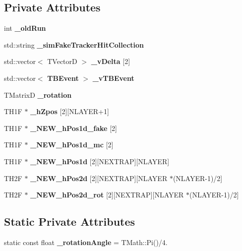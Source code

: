 \subsection*{Private Attributes}
\begin{DoxyCompactItemize}
\item 
int {\bfseries \_\-oldRun}\label{classTBTrackScatter_a2372dac837987cb91190c765e88afe5e}

\item 
std::string {\bfseries \_\-simFakeTrackerHitCollection}\label{classTBTrackScatter_aa6588dd0c39bb7233713e0316aa79bf1}

\item 
std::vector$<$ TVectorD $>$ {\bfseries \_\-vDelta} [2]\label{classTBTrackScatter_a4cc08b20f1c47a776a17b0fbdf3b5cde}

\item 
std::vector$<$ {\bf TBEvent} $>$ {\bfseries \_\-vTBEvent}\label{classTBTrackScatter_a8b5488d90a4609d9ad0c76bd8b9eafc0}

\item 
TMatrixD {\bfseries \_\-rotation}\label{classTBTrackScatter_a6e0f3f493843e958a26f97abdf016719}

\item 
TH1F $\ast$ {\bfseries \_\-hZpos} [2][NLAYER+1]\label{classTBTrackScatter_a6346d26d8e806ce65a0c2c4988f0c4c1}

\item 
TH1F $\ast$ {\bfseries \_\-NEW\_\-hPos1d\_\-fake} [2]\label{classTBTrackScatter_a97015843273ab4a90ebeb8cdb69a4992}

\item 
TH1F $\ast$ {\bfseries \_\-NEW\_\-hPos1d\_\-mc} [2]\label{classTBTrackScatter_a19bbb91bc1540399f5eaee549556f316}

\item 
TH1F $\ast$ {\bfseries \_\-NEW\_\-hPos1d} [2][NEXTRAP][NLAYER]\label{classTBTrackScatter_a97b84e856a277819cd7f247ea60d44a6}

\item 
TH2F $\ast$ {\bfseries \_\-NEW\_\-hPos2d} [2][NEXTRAP][NLAYER $\ast$(NLAYER-\/1)/2]\label{classTBTrackScatter_a6603bd7007c65e8d0c1629f2aea1f28e}

\item 
TH2F $\ast$ {\bfseries \_\-NEW\_\-hPos2d\_\-rot} [2][NEXTRAP][NLAYER $\ast$(NLAYER-\/1)/2]\label{classTBTrackScatter_ad1e3af55a110dbf0643010d441081184}

\end{DoxyCompactItemize}
\subsection*{Static Private Attributes}
\begin{DoxyCompactItemize}
\item 
static const float {\bfseries \_\-rotationAngle} = TMath::Pi()/4.\label{classTBTrackScatter_afc07015eaaeb5336f43d061ab54dfc67}

\end{DoxyCompactItemize}


